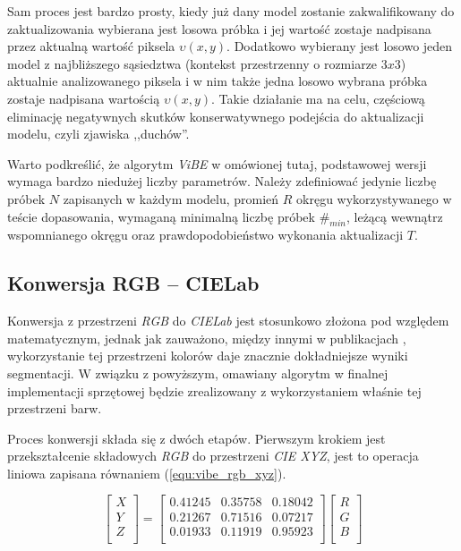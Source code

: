 Sam proces jest bardzo prosty, kiedy już dany model zostanie zakwalifikowany do zaktualizowania wybierana jest losowa próbka i jej wartość zostaje nadpisana przez aktualną wartość piksela $\upsilon(x,y)$. 
Dodatkowo wybierany jest losowo jeden model z najbliższego sąsiedztwa (kontekst przestrzenny o rozmiarze $3x3$) aktualnie analizowanego piksela i w nim także jedna losowo wybrana próbka zostaje nadpisana wartością $\upsilon(x,y)$. Takie działanie ma na celu, częściową eliminację negatywnych skutków konserwatywnego podejścia do aktualizacji modelu, czyli zjawiska ,,duchów''. 

Warto podkreślić, że algorytm \textit{ViBE} w omówionej tutaj, podstawowej wersji wymaga bardzo niedużej liczby parametrów. 
Należy zdefiniować jedynie liczbę próbek $N$ zapisanych w każdym modelu, promień $R$ okręgu wykorzystywanego w teście dopasowania, wymaganą minimalną liczbę próbek $\#_{min}$, leżącą wewnątrz wspomnianego okręgu oraz prawdopodobieństwo wykonania aktualizacji $T$.


\subsection{Konwersja RGB -- CIELab}
\label{subsec:vibe_cielab}

Konwersja z przestrzeni \textit{RGB} do \textit{CIELab} jest stosunkowo złożona pod względem matematycznym, jednak jak zauważono, między innymi w publikacjach \cite{kryjak_13_vibe, kryjak_14_vibe}, wykorzystanie tej przestrzeni kolorów daje znacznie dokładniejsze wyniki segmentacji. 
W związku z powyższym, omawiany algorytm w finalnej implementacji sprzętowej będzie zrealizowany z wykorzystaniem właśnie tej przestrzeni barw. 

Proces konwersji składa się z dwóch etapów. 
Pierwszym krokiem jest przekształcenie składowych \textit{RGB} do przestrzeni \textit{CIE XYZ}, jest to operacja liniowa zapisana równaniem (\ref{equ:vibe_rgb_xyz}).

	\begin{equation}
		\begin{bmatrix}
			X \\
			Y \\
			Z \\
		\end{bmatrix}
		=
		\begin{bmatrix}
			0.41245 & 0.35758 & 0.18042 \\
			0.21267 & 0.71516 & 0.07217 \\
			0.01933 & 0.11919 & 0.95923 \\
		\end{bmatrix}
		\begin{bmatrix}
			R \\
			G \\
			B \\
		\end{bmatrix}
	\label{equ:vibe_rgb_xyz}	
	\end{equation}	 

